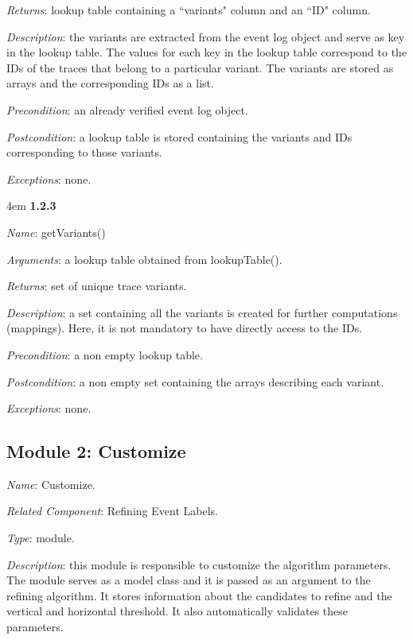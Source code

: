 \documentclass[notitlepage]{article}
\begin{document}
\begin{flushleft}
\textit{Returns}: lookup table containing a ``variants" column and an ``ID" column.

\textit{Description}: the variants are extracted from the event log object and serve as key in the lookup table. The values for each key in the lookup table correspond to the IDs of the traces that belong to a particular variant. The variants are stored as arrays and the corresponding IDs as a list.

\textit{Precondition}: an already verified event log object.

\textit{Postcondition}: a lookup table is stored containing the variants and IDs corresponding to those variants.

\textit{Exceptions}: none.

\par
\endgroup

\medskip

\par
\begingroup
\leftskip4em
\textbf{1.2.3}

\textit{Name}: getVariants()

\textit{Arguments}: a lookup table obtained from lookupTable().

\textit{Returns}: set of unique trace variants.

\textit{Description}: a set containing all the variants is created for further computations (mappings). Here, it is not mandatory to have directly access to the IDs.

\textit{Precondition}: a non empty lookup table.

\textit{Postcondition}: a non empty set containing the arrays describing each variant.

\textit{Exceptions}: none.

\par
\endgroup

\subsection{Module 2: Customize}
\textit{Name}: Customize.

\textit{Related Component}: Refining Event Labels.

\textit{Type}: module.

\textit{Description}: this module is responsible to customize the algorithm parameters. The module serves as a model class and it is passed as an argument to the refining algorithm.
It stores information about the candidates to refine and the vertical and horizontal threshold. It also automatically validates these parameters.  


\end{flushleft}
\end{document}

